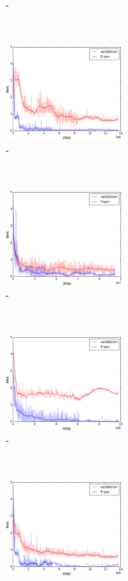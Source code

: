 \begin{figure}[t]
\begin{subfigure}[t]{0.3\textwidth}
        \caption{\label{fig:m2f1}\mtwo-\fone}
    \end{subfigure}%
    ~
    \begin{subfigure}[t]{0.3\textwidth}
        \centering
        \includegraphics[height=3.5cm]{Images/step_m2f2.png}
        \caption{\label{fig:m2f2}\mtwo-\ftwo}
    \end{subfigure}%
    ~
    \begin{subfigure}[t]{0.3\textwidth}
        \centering
        \includegraphics[height=3.5cm]{Images/step_m2f3.png}
        \caption{\label{fig:m2f3}\mtwo-\fthree}
    \end{subfigure}%
        \\
    \begin{subfigure}[t]{0.3\textwidth}
        \centering
        \includegraphics[height=3.5cm]{Images/step_m3f1.png}
        \caption{\label{fig:m3f1}\mthree-\fone}
    \end{subfigure}%
    ~
    \begin{subfigure}[t]{0.3\textwidth}
        \centering
        \includegraphics[height=3.5cm]{Images/step_m3f2.png}

\end{subfigure}
\end{figure}
